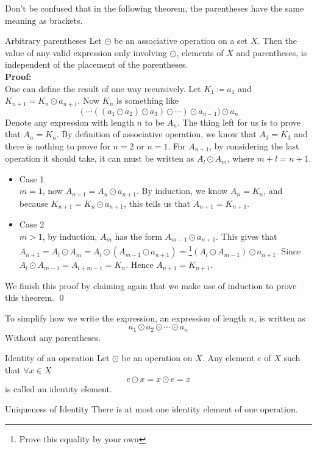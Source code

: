 \documentclass{article}
\begin{document}
Don't be confused that in the following theorem, the parentheses have the same meaning as brackets.
\begin{thm}{Arbitrary parentheses}
    Let $\odot$ be an associative operation on a set $X$. Then the value of any valid expression only involving $\odot$, elements of $X$ and parentheses,
is independent of the placement of the parentheses.\\
\textbf{Proof:}\\
One can define the result of one way recursively. Let $K_1 \coloneqq a_1$ and $K_{n+1} = K_n \odot a_{n+1}$. Now $K_n$ is something like
$$
(\cdots((a_1 \odot a_2)\odot a_3)\odot \cdots)\odot a_{n-1})\odot a_n
$$
Denote any expression with length $n$ to be $A_n$. The thing left for us is to prove that $A_n = K_n$. By definition of associative operation, we know that
$A_3 = K_3$ and there is nothing to prove for $n = 2$ or $n = 1$. For $A_{n+1}$, by considering the last operation it should take, it can must be written as $A_l \odot A_m$,
where $m + l = n + 1$.
\begin{itemize}
    \item{Case 1}\\
     $m = 1$, now $A_{n+1} = A_n \odot a_{n+1}$. By induction, we know $A_n = K_n$, and because $K_{n+1} = K_n \odot a_{n+1}$, this tells us that $A_{n+1} =K_{n+1}$.
    \item{Case 2}\\
     $m > 1$, by induction, $A_m$ has the form $A_{m-1} \odot a_{n+1}$. This gives that $A_{n+1} = A_l \odot A_m = A_l \odot (A_{m-1} \odot a_{n+1})=$\footnote{Prove this equality by your own}$(A_l \odot A_{m-1})\odot a_{n+1}$.
     Since $A_l \odot A_{m-1} = A_{l+m-1} = K_{n}$. Hence $A_{n+1} = K_{n+1}$.
\end{itemize}
We finish this proof by claiming again that we make use of induction to prove this theorem.
\qed
\end{thm}
To simplify how we write the expression, an expression of length $n$, is written as
$$
a_1 \odot a_2 \odot \cdots \odot a_n
$$
Without any parentheses.
\begin{defin}{Identity of an operation}
    Let $\odot$ be an operation on $X$. Any element $e$ of $X$ such that $\forall x \in X$
    $$
    e \odot x = x \odot e = x
    $$
is called an identity element.
\end{defin}
\begin{lemma}{Uniqueness of Identity}
    There is at most one identity element of one operation.
\end{lemma}
\end{document}

